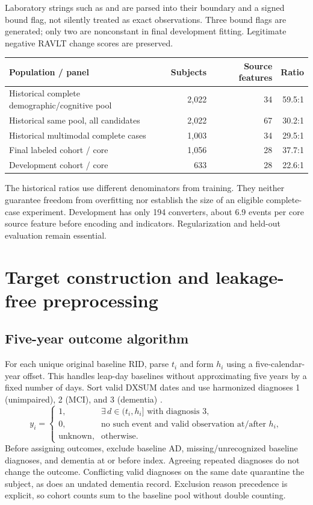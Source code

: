 \documentclass[11pt,a4paper]{article}
\newcommand{\field}[1]{\texttt{\detokenize{#1}}}
\begin{document}
Laboratory strings such as \field{>1700} and \field{<80} are parsed into their boundary and a signed bound flag, not silently treated as exact observations. Three bound flags are generated; only two are nonconstant in final development fitting. Legitimate negative RAVLT change scores are preserved.
\begin{center}\small
\begin{tabular}{p{.48\linewidth}rrr}\hline
Population / panel & Subjects & Source features & Ratio\\\hline
Historical complete demographic/cognitive pool & 2,022 & 34 & 59.5:1\\
Historical same pool, all candidates & 2,022 & 67 & 30.2:1\\
Historical multimodal complete cases & 1,003 & 34 & 29.5:1\\
Final labeled cohort / core & 1,056 & 28 & 37.7:1\\
Development cohort / core & 633 & 28 & 22.6:1\\
\hline\end{tabular}\end{center}
The historical ratios use different denominators from training. They neither guarantee freedom from overfitting nor establish the size of an eligible complete-case experiment. Development has only 194 converters, about 6.9 events per core source feature before encoding and indicators. Regularization and held-out evaluation remain essential.

\clearpage
\section{Target construction and leakage-free preprocessing}
\subsection{Five-year outcome algorithm}
For each unique original baseline RID, parse $t_i$ and form $h_i$ using a five-calendar-year offset. This handles leap-day baselines without approximating five years by a fixed number of days. Sort valid DXSUM dates and use harmonized diagnoses 1 (unimpaired), 2 (MCI), and 3 (dementia) \cite{adni}.
\begin{equation}
y_i=\begin{cases}
1,&\exists\,d\in(t_i,h_i]\text{ with diagnosis }3,\\
0,&\text{no such event and valid observation at/after }h_i,\\
\text{unknown},&\text{otherwise.}
\end{cases}
\end{equation}
Before assigning outcomes, exclude baseline AD, missing/unrecognized baseline diagnoses, and dementia at or before index. Agreeing repeated diagnoses do not change the outcome. Conflicting valid diagnoses on the same date quarantine the subject, as does an undated dementia record. Exclusion reason precedence is explicit, so cohort counts sum to the baseline pool without double counting.
\end{document}
